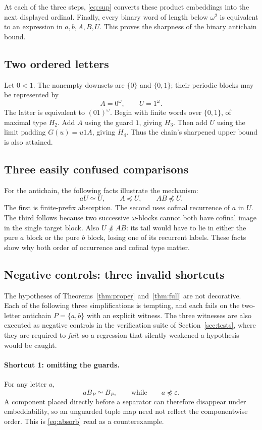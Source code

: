 \documentclass[11pt,a4paper]{article}
\numberwithin{equation}{section}
\theoremstyle{definition}
\theoremstyle{remark}
\newcommand{\eps}{\varepsilon}
\newcommand{\emb}{\preccurlyeq}
\newcommand{\eqv}{\simeq}
\begin{document}
At each of the three steps, \eqref{eq:sup} converts these product embeddings
into the next displayed ordinal. Finally, every binary word of length
below $\omega^2$ is equivalent to an expression in $a,b,A,B,U$.
This proves the sharpness of the binary antichain bound.

\subsection{Two ordered letters}
Let $0<1$. The nonempty downsets are $\{0\}$ and $\{0,1\}$; their periodic
blocks may be represented by
\[
 A=0^\omega,\qquad U=1^\omega.
\]
The latter is equivalent to $(01)^\omega$. Begin with finite words over
$\{0,1\}$, of maximal type $H_2$. Add $A$ using the guard $1$, giving
$H_3$. Then add $U$ using the limit padding $G(u)=u1A$, giving $H_4$.
Thus the chain's sharpened upper bound is also attained.

\subsection{Three easily confused comparisons}
For the antichain, the following facts illustrate the mechanism:
\[
 aU\eqv U,\qquad A\emb U,\qquad AB\not\emb U.
\]
The first is finite-prefix absorption. The second uses cofinal recurrence
of $a$ in $U$. The third follows because two successive $\omega$-blocks
cannot both have cofinal image in the single target block. Also
$U\not\emb AB$: its tail would have to lie in either the pure $a$ block
or the pure $b$ block, losing one of its recurrent labels. These facts
show why both order of occurrence and cofinal type matter.

\subsection{Negative controls: three invalid shortcuts}
\label{sec:negative}

The hypotheses of Theorems~\ref{thm:proper} and~\ref{thm:full} are not
decorative. Each of the following three simplifications is tempting, and each
fails on the two-letter antichain $P=\{a,b\}$ with an explicit witness. The
three witnesses are also executed as negative controls in the verification
suite of Section~\ref{sec:tests}, where they are required to \emph{fail},
so a regression that silently weakened a hypothesis would be caught.

\paragraph{Shortcut 1: omitting the guards.}
For any letter $a$,
\begin{equation}\label{eq:neg1}
 aB_P\eqv B_P,\qquad\text{while}\qquad a\not\emb\eps .
\end{equation}
A component placed directly before a separator can therefore disappear under
embeddability, so an unguarded tuple map need not reflect the componentwise
order. This is \eqref{eq:absorb} read as a counterexample.
\end{document}
